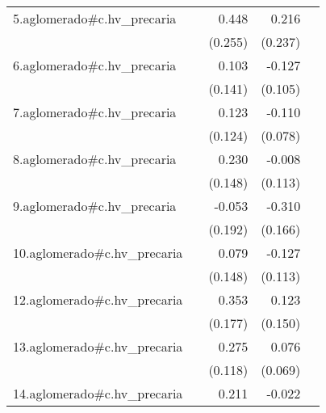 {\begin{longtable}{l*{4}{D{.}{.}{-1}}}
\addlinespace
5.aglomerado#c.hv\_precaria&                     &       0.448         &       0.216         &                     \\
            &                     &     (0.255)         &     (0.237)         &                     \\
\addlinespace
6.aglomerado#c.hv\_precaria&                     &       0.103         &      -0.127         &                     \\
            &                     &     (0.141)         &     (0.105)         &                     \\
\addlinespace
7.aglomerado#c.hv\_precaria&                     &       0.123         &      -0.110         &                     \\
            &                     &     (0.124)         &     (0.078)         &                     \\
\addlinespace
8.aglomerado#c.hv\_precaria&                     &       0.230         &      -0.008         &                     \\
            &                     &     (0.148)         &     (0.113)         &                     \\
\addlinespace
9.aglomerado#c.hv\_precaria&                     &      -0.053         &      -0.310         &                     \\
            &                     &     (0.192)         &     (0.166)         &                     \\
\addlinespace
10.aglomerado#c.hv\_precaria&                     &       0.079         &      -0.127         &                     \\
            &                     &     (0.148)         &     (0.113)         &                     \\
\addlinespace
12.aglomerado#c.hv\_precaria&                     &       0.353\sym{*}  &       0.123         &                     \\
            &                     &     (0.177)         &     (0.150)         &                     \\
\addlinespace
13.aglomerado#c.hv\_precaria&                     &       0.275\sym{*}  &       0.076         &                     \\
            &                     &     (0.118)         &     (0.069)         &                     \\
\addlinespace
14.aglomerado#c.hv\_precaria&                     &       0.211         &      -0.022         &                     \\

\end{longtable}}
